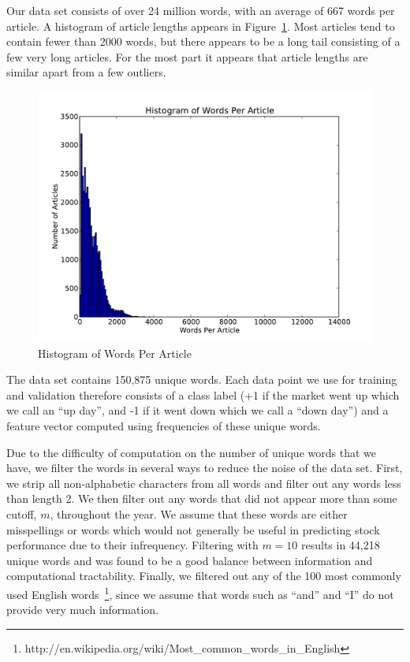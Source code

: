 \documentclass[10pt, twocolumn]{article}
\begin{document}
Our data set consists of over 24 million words, with an average of 667 words per article. A histogram of article lengths appears in Figure~\ref{wordshist}. Most articles tend to contain fewer than 2000 words, but there appears to be a long tail consisting of a few very long articles. For the most part it appears that article lengths are similar apart from a few outliers.


\begin{figure}
\centering
\includegraphics[scale=0.3]{text/wordshist.pdf}
\caption{Histogram of Words Per Article}
\label{wordshist}
\end{figure}

The data set contains 150,875 unique words. Each data point we use for training and validation therefore consists of a class label (+1 if the market went up which we call an ``up day'', and -1 if it went down which we call a ``down day'') and a feature vector computed using frequencies of these unique words.

Due to the difficulty of computation on the number of unique words that we have, we filter the words in several ways to reduce the noise of the data set. First, we strip all non-alphabetic characters from all words and filter out any words less than length 2. We then filter out any words that did not appear more than some cutoff, $m$, throughout the year. We assume that these words are either misspellings or words which would not generally be useful in predicting stock performance due to their infrequency. Filtering with $m = 10$ results in 44,218 unique words and was found to be a good balance between information and computational tractability.
Finally, we filtered out any of the 100 most commonly used English words~\footnote{http://en.wikipedia.org/wiki/Most\_common\_words\_in\_English}, since we
assume that words such as ``and'' and ``I'' do not provide very much information.
\end{document}
